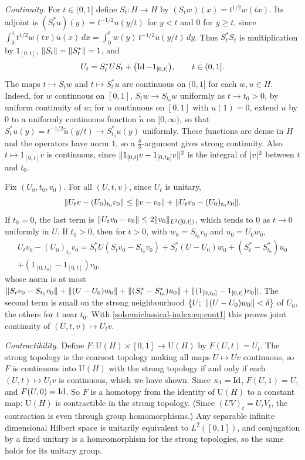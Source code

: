 \emph{Continuity.} For $t\in(0,1]$ define $S_t:H\to H$ by $(S_tw)(x)=t^{1/2}w(tx)$.
Its adjoint is $(S_t^*u)(y)=t^{-1/2}u(y/t)$ for $y<t$ and $0$ for $y\ge t$, since
$\int_0^1t^{1/2}w(tx)\bar u(x)\,dx=\int_0^tw(y)\,t^{-1/2}\bar u(y/t)\,dy$. Thus
$S_t^*S_t$ is multiplication by $1_{[0,t]}$, $\lVert S_t\rVert=\lVert S_t^*\rVert=1$, and
\begin{equation*}
  U_t=S_t^*US_t+\bigl(\operatorname{Id}-1_{[0,t]}\bigr),\qquad t\in(0,1].
\end{equation*}
The maps $t\mapsto S_tw$ and $t\mapsto S_t^*u$ are continuous on $(0,1]$ for each
$w,u\in H$. Indeed, for $w$ continuous on $[0,1]$, $S_tw\to S_{t_0}w$ uniformly as
$t\to t_0>0$, by uniform continuity of $w$; for $u$ continuous on $[0,1]$ with
$u(1)=0$, extend $u$ by $0$ to a uniformly continuous function $\tilde u$ on
$[0,\infty)$, so that $S_t^*u(y)=t^{-1/2}\tilde u(y/t)\to S_{t_0}^*u(y)$
uniformly. These functions are dense in $H$ and the operators have norm $1$, so a
$\frac\delta3$-argument gives strong continuity. Also $t\mapsto1_{[0,t]}v$ is
continuous, since $\lVert 1_{[0,t]}v-1_{[0,t_0]}v\rVert^2$ is the integral of $\lvert v\rvert^2$
between $t$ and $t_0$.

Fix $(U_0,t_0,v_0)$. For all $(U,t,v)$, since $U_t$ is unitary,
\begin{equation}\label{solsemiclassical-index:eq:cont1}
  \lVert U_tv-(U_0)_{t_0}v_0\rVert\le\lVert v-v_0\rVert+\lVert U_tv_0-(U_0)_{t_0}v_0\rVert.
\end{equation}
If $t_0=0$, the last term is $\lVert U_tv_0-v_0\rVert\le2\lVert v_0\rVert_{L^2([0,t])}$, which
tends to $0$ as $t\to0$ uniformly in $U$. If $t_0>0$, then for $t>0$, with
$w_0=S_{t_0}v_0$ and $u_0=U_0w_0$,
\begin{multline*}
  U_tv_0-(U_0)_{t_0}v_0=S_t^*U(S_tv_0-S_{t_0}v_0)+S_t^*(U-U_0)w_0
  +(S_t^*-S_{t_0}^*)u_0\\+(1_{[0,t_0]}-1_{[0,t]})v_0,
\end{multline*}
whose norm is at most $\lVert S_tv_0-S_{t_0}v_0\rVert+\lVert (U-U_0)w_0\rVert+
\lVert (S_t^*-S_{t_0}^*)u_0\rVert+\lVert (1_{[0,t_0]}-1_{[0,t]})v_0\rVert$. The second term is
small on the strong neighbourhood $\{U;\ \lVert (U-U_0)w_0\rVert<\delta\}$ of $U_0$, the
others for $t$ near $t_0$. With \eqref{solsemiclassical-index:eq:cont1} this proves
joint continuity of $(U,t,v)\mapsto U_tv$.

\emph{Contractibility.} Define $F:\mathrm U(H)\times[0,1]\to\mathrm U(H)$ by
$F(U,t)=U_t$. The strong topology is the coarsest topology making all maps
$U\mapsto Uv$ continuous, so $F$ is continuous into $\mathrm U(H)$ with the strong
topology if and only if each $(U,t)\mapsto U_tv$ is continuous, which we have
shown. Since $\kappa_1=\operatorname{Id}$, $F(U,1)=U$, and $F(U,0)=\operatorname{Id}$. So $F$ is a homotopy
from the identity of $\mathrm U(H)$ to a constant map: $\mathrm U(H)$ is
contractible in the strong topology. (Since $(UV)_t=U_tV_t$, the contraction is even
through group homomorphisms.) Any separable infinite dimensional Hilbert space is
unitarily equivalent to $L^2([0,1])$, and conjugation by a fixed unitary is a
homeomorphism for the strong topologies, so the same holds for its unitary group.

